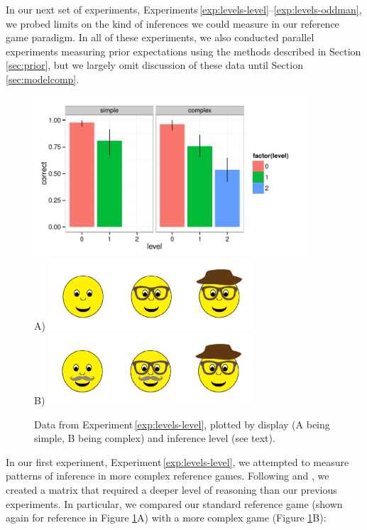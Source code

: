 \documentclass[man,noapacite]{apa2}
\newcounter{Experiment}
\newcommand{\exptref}[1]{Experiment\,\ref{#1}}
\newcommand{\exptrefrange}[2]{Experiments\,\ref{#1}--\ref{#2}}
\begin{document}
In our next set of experiments, \exptrefrange{exp:levels-level}{exp:levels-oddman}, we probed limits on the kind of inferences we could measure in our reference game paradigm. In all of these experiments, we also conducted parallel experiments measuring prior expectations using the methods described in Section \ref{sec:prior}, but we largely omit discussion of these data until Section \ref{sec:modelcomp}.


 \begin{figure}[t]
  \centering
  \includegraphics[width=4in]{../plots/3-levels-levels.pdf}\\
  A) \includegraphics[width=3in]{figures/hatglasses.pdf}\\
  B) \includegraphics[width=3in]{figures/levels-levels-stim.pdf}
  \caption{\label{fig:levels-level} Data from \exptref{exp:levels-level}, plotted by display (A being simple, B being complex) and inference level (see text).}
\end{figure}


In our first experiment, \exptref{exp:levels-level}, we attempted to measure patterns of inference in more complex reference games. Following  and , we created a matrix that required a deeper level of reasoning than our previous experiments. In particular, we compared our standard reference game (shown again for reference in Figure \ref{fig:levels-level}A) with a more complex game (Figure \ref{fig:levels-level}B):
\end{document}

